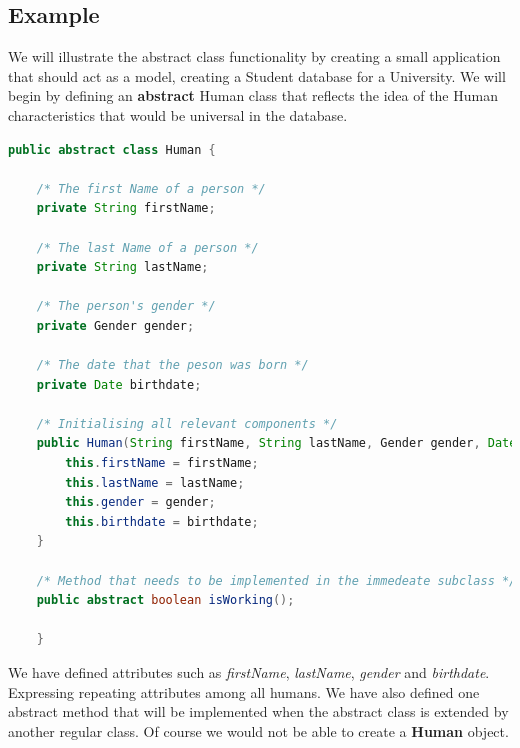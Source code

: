 \documentclass{article}
\begin{document}
        \subsection{Example}
            We will illustrate the abstract class functionality by creating a small application that should act as a model, creating a Student database for a University. We will begin by defining an \textbf{abstract} Human class that reflects the idea of the Human characteristics that would be universal in the database.
            \begin{lstlisting}[language=java]
    public abstract class Human {
	
	/* The first Name of a person */
	private String firstName;
	
	/* The last Name of a person */
	private String lastName;
	
	/* The person's gender */
	private Gender gender;
	
	/* The date that the peson was born */
	private Date birthdate;

	/* Initialising all relevant components */
	public Human(String firstName, String lastName, Gender gender, Date birthdate) {
		this.firstName = firstName;
		this.lastName = lastName;
		this.gender = gender;
		this.birthdate = birthdate;
	}
	
	/* Method that needs to be implemented in the immedeate subclass */
	public abstract boolean isWorking();
    
    }
            \end{lstlisting}
We have defined attributes such as \textit{firstName}, \textit{lastName}, \textit{gender} and \textit{birthdate}. Expressing repeating attributes among all humans. We have also defined one abstract method that will be implemented when the abstract class is extended by another regular class. 
Of course we would not be able to create a \textbf{Human} object.\\
\end{document}
